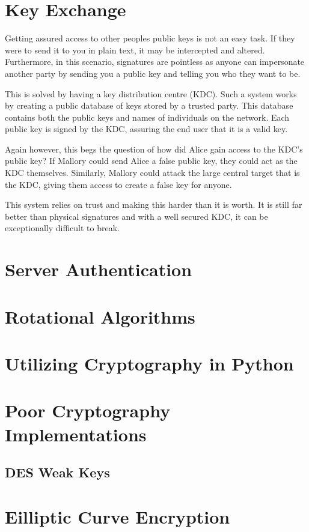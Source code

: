 	\section{Key Exchange}
		Getting assured access to other peoples public keys is not an easy task. 
		If they were to send it to you in plain text, it may be intercepted and altered. 
		Furthermore, in this scenario, signatures are pointless as anyone can impersonate another party by sending you a public key and telling you who they want to be. 

		This is solved by having a key distribution centre (KDC). 
		Such a system works by creating a public database of keys stored by a trusted party.
		This database contains both the public keys and names of individuals on the network. 
		Each public key is signed by the KDC, assuring the end user that it is a valid key. 

		Again however, this begs the question of how did Alice gain access to the KDC's public key?
		If Mallory could send Alice a false public key, they could act as the KDC themselves. 
		Similarly, Mallory could attack the large central target that is the KDC, giving them access to create a false key for anyone. 

		This system relies on trust and making this harder than it is worth. 
		It is still far better than physical signatures and with a well secured KDC, it can be exceptionally difficult to break. 
	\section{Server Authentication}
	\section{Rotational Algorithms}
	\section{Utilizing Cryptography in Python}
	\section{Poor Cryptography Implementations}
		\subsection{DES Weak Keys}
	\section{Eilliptic Curve Encryption}
